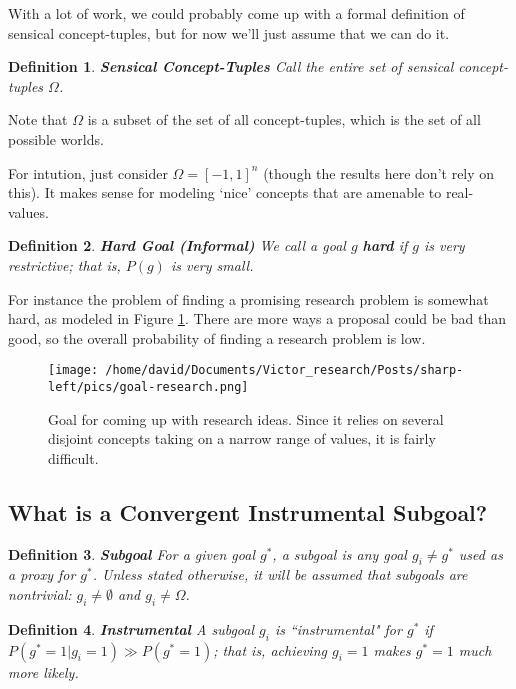 \documentclass{article}
\newtheorem{definition}{Definition}
\begin{document}
With a lot of work, we could probably come up with a formal definition of sensical concept-tuples, but for now we'll just assume that we can do it.

\begin{definition}{\textbf{Sensical Concept-Tuples}}
    Call the entire set of sensical concept-tuples $\Omega$.
\end{definition}

Note that $\Omega$ is a subset of the set of all concept-tuples, which is the set of all possible worlds.


For intution, just consider $\Omega=[-1,1]^n$ (though the results here don't rely on this). It makes sense for modeling `nice' concepts that are amenable to real-values. 

\begin{definition}{\textbf{Hard Goal (Informal)}}
    We call a goal $g$ \textbf{hard} if $g$ is very restrictive; that is, $P(g)$ is very small.
\end{definition}

For instance the problem of finding a promising research problem is somewhat hard, as modeled in Figure \ref{fig:goal-research}. There are more ways a proposal could be bad than good, so the overall probability of finding a research problem is low.

\begin{figure}[ht]
    \centering
    \texttt{[image: /home/david/Documents/Victor\_research/Posts/sharp-left/pics/goal-research.png]} 
    \caption{Goal for coming up with research ideas. Since it relies on several disjoint concepts taking on a narrow range of values, it is fairly difficult.}
    \label{fig:goal-research} 
\end{figure}

\subsection{What is a Convergent Instrumental Subgoal?}

\begin{definition}{\textbf{Subgoal}}
    For a given goal $g^*$, a subgoal is any goal $g_i \neq g^*$ used as a proxy for $g^*$. Unless stated otherwise, it will be assumed that subgoals are nontrivial: $g_i \neq \emptyset$ and $g_i \neq \Omega$.
\end{definition}

\begin{definition}{\textbf{Instrumental}}
    A subgoal $g_i$ is ``instrumental" for $g^*$ if $P(g^*=1|g_i=1)\gg P(g^*=1)$; that is, achieving $g_i=1$ makes $g^*=1$ much more likely.
\end{definition}
\end{document}
